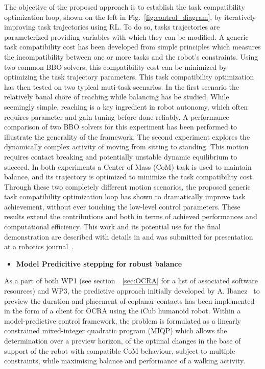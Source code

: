 The objective of the proposed approach is to establish the task compatibility optimization loop, shown on the left in Fig.~\ref{fig:control_diagram}, by iteratively improving task trajectories using RL. To do so, tasks trajectories are parameterized providing variables with which they can be modified. A generic task compatibility cost has been developed from simple principles which measures the incompatibility between one or more tasks and the robot's constraints. Using two common BBO solvers, this compatibility cost can be minimized by optimizing the task trajectory parameters. This task compatibility optimization has then tested on two typical muti-task scenarios. In the first scenario the relatively banal chore of reaching while balancing has be studied. While seemingly simple, reaching is a key ingredient in robot autonomy, which often requires parameter and gain tuning before done reliably. A performance comparison of two BBO solvers for this experiment has been performed to illustrate the generality of the framework. The second experiment explores the dynamically complex activity of moving from sitting to standing. This motion requires contact breaking and potentially unstable dynamic equilibrium to succeed. In both experiments a Center of Mass (CoM) task is used to maintain balance, and its trajectory is optimized to minimize the task compatibility cost. Through these two completely different motion scenarios, the proposed generic task compatibility optimization loop has shown to dramatically improve task achievement, without ever touching the low-level control parameters. These results extend the contributions \cite{lober-HUMANOIDS2014} and \cite{lober_IROS2015} both in terms of achieved performances and computational efficiency. This work and its potential use for the final demonstration are described with details in \cite{deliverable33} and was submitted for presentation at a robotics journal~\cite{lober2017RAL-IROS}.

\begin{itemize}
\item \textbf{Model Predicitive stepping for robust balance}
\end{itemize}

As a part of both WP1 (see section~~\ref{sec:OCRA} for a list of associated software resources) and WP3, the predictive approach initially developed by A. Ibanez~\cite{ibanez2015Emergence} to preview the duration and placement of coplanar contacts has been implemented in the form of a client for OCRA using the iCub humanoid robot. Within a model-predictive control framework, the problem is formulated as a linearly constrained mixed-integer quadratic program (MIQP) which allows the determination over a preview horizon, of the optimal changes in the base of support of the robot with compatible CoM behaviour, subject to multiple constraints, while maximising balance and performance of a walking activity.

